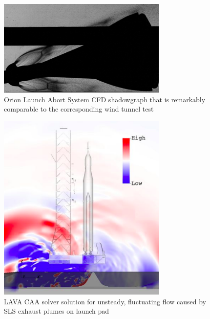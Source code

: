 \documentclass[]{aiaa-tc}%
\begin{document}
\begin{figure}[htb]
\begin{center}
\includegraphics[width=0.75\textwidth]{Images/LAS_CFD_Shadowgraph.png}
\caption{Orion Launch Abort System CFD shadowgraph that is remarkably comparable to the corresponding wind tunnel test \cite{OverflowOrionAbortGuidelines}}
\label{LASCFDshadowgraph}
\end{center}
\end{figure}

\begin{figure}[htb]
\begin{center}
\includegraphics[width=0.75\textwidth]{Images/LAVA_SLS.png}
\caption{LAVA CAA solver solution for unsteady, fluctuating flow caused by SLS exhaust plumes on launch pad \cite{LAVA}}
\label{LAVASLS}
\end{center}
\end{figure}
\end{document}
